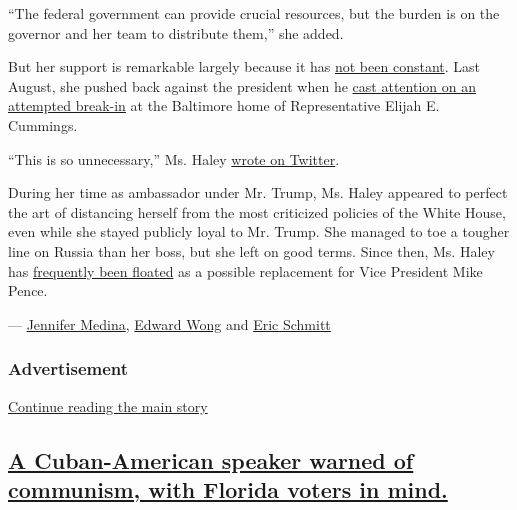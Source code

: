 ``The federal government can provide crucial resources, but the burden
is on the governor and her team to distribute them,'' she added.

But her support is remarkable largely because it has
\href{https://www.nytimes3xbfgragh.onion/2019/11/19/us/politics/nikki-haley-trump.html}{not
been constant}. Last August, she pushed back against the president when
he
\href{https://www.nytimes3xbfgragh.onion/2019/08/02/us/trump-elijah-cummings-house-robbed.html}{cast
attention on an attempted break-in} at the Baltimore home of
Representative Elijah E. Cummings.

``This is so unnecessary,'' Ms. Haley
\href{https://twitter.com/nikkihaley/status/1157316435221405697?lang=en}{wrote
on Twitter}.

During her time as ambassador under Mr. Trump, Ms. Haley appeared to
perfect the art of distancing herself from the most criticized policies
of the White House, even while she stayed publicly loyal to Mr. Trump.
She managed to toe a tougher line on Russia than her boss, but she left
on good terms. Since then, Ms. Haley has
\href{https://www.nytimes3xbfgragh.onion/2020/08/08/us/politics/kristi-noem-pence-trump.html}{frequently
been floated} as a possible replacement for Vice President Mike Pence.

---
\href{https://www.nytimes3xbfgragh.onion/by/jennifer-medina}{Jennifer
Medina}, \href{https://www.nytimes3xbfgragh.onion/by/edward-wong}{Edward
Wong} and \href{https://www.nytimes3xbfgragh.onion/by/eric-schmitt}{Eric
Schmitt}

\hypertarget{advertisement-1}{%
\subsubsection{Advertisement}\label{advertisement-1}}

\protect\hyperlink{after-dfp-ad-mid2}{Continue reading the main story}

\hypertarget{a-cuban-american-speaker-warned-of-communism-with-florida-voters-in-mind}{%
\subsection{\texorpdfstring{\protect\hyperlink{a-cuban-american-speaker-warned-of-communism-with-florida-voters-in-mind}{A
Cuban-American speaker warned of communism, with Florida voters in
mind.}}{A Cuban-American speaker warned of communism, with Florida voters in mind.}}\label{a-cuban-american-speaker-warned-of-communism-with-florida-voters-in-mind}}

